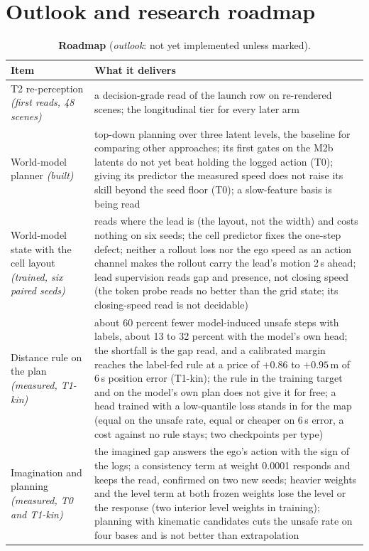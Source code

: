 \documentclass[10pt,twocolumn]{article}
\theoremstyle{remark}
\newcommand{\tier}[1]{\textsc{\small #1}}
\begin{document}
\section{Outlook and research roadmap}\label{sec:outlook}
\begin{table}[!t]
\centering
\caption{\textbf{Roadmap} (\emph{outlook}: not yet implemented unless marked).}
\label{tab:roadmap}
\footnotesize
\begin{tabularx}{\columnwidth}{@{}>{\raggedright\arraybackslash}p{24mm}>{\raggedright\arraybackslash}X@{}}
\toprule
Item & What it delivers \\
\midrule
T2 re-perception \textit{(first reads, 48 scenes)} & a decision-grade read of the launch row on re-rendered scenes; the longitudinal tier for every later arm \\
World-model planner \textit{(built)} & top-down planning over three latent levels, the baseline for comparing other approaches; its first gates on the M2b latents do not yet beat holding the logged action (\tier{T0}); giving its predictor the measured speed does not raise its skill beyond the seed floor (\tier{T0}); a slow-feature basis is being read \\
World-model state with the cell layout \textit{(trained, six paired seeds)} & reads where the lead is (the layout, not the width) and costs nothing on six seeds; the cell predictor fixes the one-step defect; neither a rollout loss nor the ego speed as an action channel makes the rollout carry the lead's motion 2\,s ahead; lead supervision reads gap and presence, not closing speed (the token probe reads no better than the grid state; its closing-speed read is not decidable) \\
Distance rule on the plan \textit{(measured, T1-kin)} & about 60 percent fewer model-induced unsafe steps with labels, about 13 to 32 percent with the model's own head; the shortfall is the gap read, and a calibrated margin reaches the label-fed rule at a price of $+0.86$ to $+0.95$\,m of 6\,s position error (T1-kin); the rule in the training target and on the model's own plan does not give it for free; a head trained with a low-quantile loss stands in for the map (equal on the unsafe rate, equal or cheaper on 6\,s error, a cost against no rule stays; two checkpoints per type) \\
Imagination and planning \textit{(measured, T0 and T1-kin)} & the imagined gap answers the ego's action with the sign of the logs; a consistency term at weight 0.0001 responds and keeps the read, confirmed on two new seeds; heavier weights and the level term at both frozen weights lose the level or the response (two interior level weights in training); planning with kinematic candidates cuts the unsafe rate on four bases and is not better than extrapolation \\

\end{tabularx}
\end{table}
\end{document}
